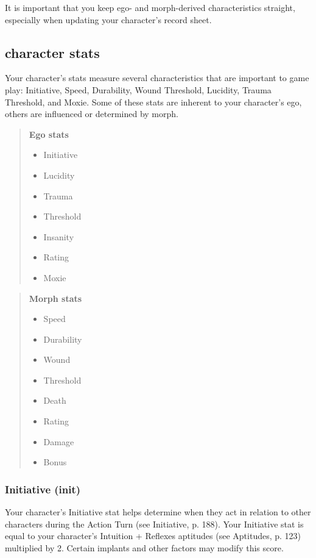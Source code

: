 It is important that you keep ego- and morph-derived characteristics straight, especially when updating your character's record sheet. 

\subsection{character stats} \label{sec:character-stats} 

Your character's stats measure several characteristics that are important to game play: Initiative, Speed, Durability, Wound Threshold, Lucidity, Trauma Threshold, and Moxie. Some of these stats are inherent to your character's ego, others are influenced or determined by morph. 

\begin{quotation} \textbf{Ego stats} \begin{itemize} \item Initiative \item Lucidity \item Trauma \item Threshold \item Insanity \item Rating \item Moxie \end{itemize} \end{quotation} 

\begin{quotation} \textbf{Morph stats} \begin{itemize} \item Speed \item Durability \item Wound \item Threshold \item Death \item Rating \item Damage \item Bonus \end{itemize} \end{quotation} 

\subsubsection{Initiative (init)} \label{sec:initiative-init} 

Your character's Initiative stat helps determine when they act in relation to other characters during the Action Turn (see Initiative, p. 188). Your Initiative stat is equal to your character's Intuition + Reflexes aptitudes (see Aptitudes, p. 123) multiplied by 2. Certain implants and other factors may modify this score. 

